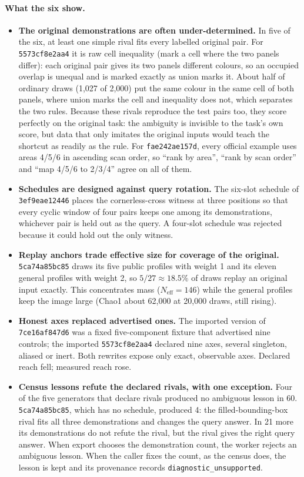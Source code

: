 \documentclass[11pt]{article}
\newcommand{\gen}[1]{\texttt{#1}}
\begin{document}
\paragraph{What the six show.}
\begin{itemize}[nosep]
  \item \textbf{The original demonstrations are often under-determined.} In five of the six, at least one simple rival fits every labelled original pair. For \gen{5573cf8e2aa4} it is raw cell inequality (mark a cell where the two panels differ): each original pair gives its two panels different colours, so an occupied overlap is unequal and is marked exactly as union marks it. About half of ordinary draws (1,027 of 2,000) put the same colour in the same cell of both panels, where union marks the cell and inequality does not, which separates the two rules. Because these rivals reproduce the test pairs too, they score perfectly on the original task: the ambiguity is invisible to the task's own score, but data that only imitates the original inputs would teach the shortcut as readily as the rule. For \gen{fae242ae157d}, every official example uses areas 4/5/6 in ascending scan order, so ``rank by area'', ``rank by scan order'' and ``map 4/5/6 to 2/3/4'' agree on all of them.
  \item \textbf{Schedules are designed against query rotation.} The six-slot schedule of \gen{3ef9eae12446} places the cornerless-cross witness at three positions so that every cyclic window of four pairs keeps one among its demonstrations, whichever pair is held out as the query. A four-slot schedule was rejected because it could hold out the only witness.
  \item \textbf{Replay anchors trade effective size for coverage of the original.} \gen{5ca74a85bc85} draws its five public profiles with weight 1 and its eleven general profiles with weight 2, so $5/27\approx18.5\%$ of draws replay an original input exactly. This concentrates mass ($N_{\mathrm{eff}}=146$) while the general profiles keep the image large (Chao1 about 62{,}000 at 20{,}000 draws, still rising).
  \item \textbf{Honest axes replaced advertised ones.} The imported version of \gen{7ce16af847d6} was a fixed five-component fixture that advertised nine controls; the imported \gen{5573cf8e2aa4} declared nine axes, several singleton, aliased or inert. Both rewrites expose only exact, observable axes. Declared reach fell; measured reach rose.
  \item \textbf{Census lessons refute the declared rivals, with one exception.} Four of the five generators that declare rivals produced no ambiguous lesson in 60. \gen{5ca74a85bc85}, which has no schedule, produced 4: the filled-bounding-box rival fits all three demonstrations and changes the query answer. In 21 more its demonstrations do not refute the rival, but the rival gives the right query answer. When export chooses the demonstration count, the worker rejects an ambiguous lesson. When the caller fixes the count, as the census does, the lesson is kept and its provenance records \texttt{diagnostic\_unsupported}.

\end{itemize}
\end{document}
